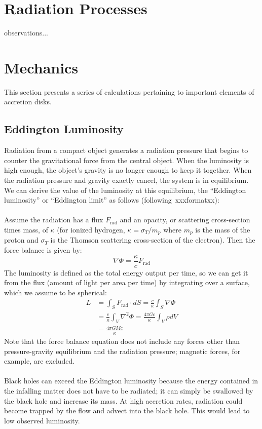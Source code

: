 \section{Radiation Processes}
observations...

\section{Mechanics}
This section presents a series of calculations pertaining to important elements of accretion disks.
\subsection{Eddington Luminosity}
Radiation from a compact object generates a radiation pressure that begins to counter the gravitational force from the central object. When the luminosity is high enough, the object's gravity is no longer enough to keep it together. When the radiation pressure and gravity exactly cancel, the system is in equilibrium. We can derive the value of the luminosity at this equilibrium, the ``Eddington luminosity'' or ``Eddington limit'' as follows (following~\cite{Spruit2009}xxxformatxx):\\
\\
Assume the radiation has a flux $F_{\textrm{rad}}$ and an opacity, or scattering cross-section times mass, of $\kappa$ (for ionized hydrogen, $\kappa=\sigma_T/m_p$ where $m_p$ is the mass of the proton and $\sigma_T$ is the Thomson scattering cross-section of the electron). Then the force balance is given by:
\begin{equation}
\nabla\Phi=\frac\kappa cF_{\textrm{rad}}
\end{equation}
The luminosity is defined as the total energy output per time, so we can get it from the flux (amount of light per area per time) by integrating over a surface, which we assume to be spherical:
\begin{align}
L&=\int_SF_{\mathrm{rad}}\cdot dS=\frac{c}\kappa \int_S \nabla\Phi\\
&=\frac{c}\kappa \int_V \nabla^2\Phi=\frac{4\pi Gc}\kappa\int_V\rho dV\\
&=\frac{4\pi GMc}\kappa
\end{align}
Note that the force balance equation does not include any forces other than pressure-gravity equilibrium and the radiation pressure; magnetic forces, for example, are excluded. \\
\\
Black holes can exceed the Eddington luminosity because the energy contained in the infalling matter does not have to be radiated; it can simply be swallowed by the black hole and increase its mass. At high accretion rates, radiation could become trapped by the flow and advect into the black hole. This would lead to low observed luminosity. 

